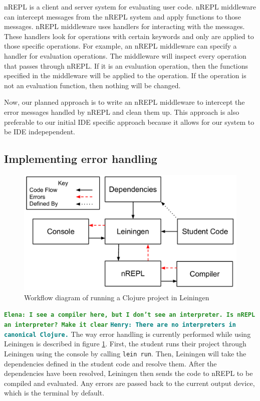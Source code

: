 \documentclass[12pt]{article}
\newcommand{\comment}[1]{{\bf \tt  {#1}}}
\newcommand{\emcomment}[1]{\textcolor{ForestGreen}{\comment{Elena: {#1}}}}
\newcommand{\hfcomment}[1]{\textcolor{Teal}{\comment{Henry: {#1}}}}
\begin{document}
nREPL is a client and server system for evaluating user code. nREPL middleware can 
intercept messages from the nREPL system and apply functions to those messages. nREPL 
middleware uses handlers for interacting with the messages. These handlers look for 
operations with certain keywords and only are applied to those specific operations. For 
example, an nREPL middleware can specify a handler for evaluation operations. The 
middleware will inspect every operation that passes through nREPL. If it is an 
evaluation operation, then the functions specified in the middleware will be applied to 
the operation. If the operation is not an evaluation function, then nothing will be 
changed.

Now, our planned approach is to write an nREPL middleware to intercept the error 
messages handled by nREPL and clean them up. This approach is also preferable to our 
initial IDE specific approach because it allows for our system to be IDE indepependent. 

\subsection{Implementing error handling}

\begin{figure}[h]
 \includegraphics[width=12cm]{CurrentErrorHandling.pdf}
 \centering
 \caption{Workflow diagram of running a Clojure project in Leiningen}
 \label{fig:CurrentError}
\end{figure}

\emcomment{I see a compiler here, but I don't see an interpreter. Is nREPL an 
interpreter? Make it clear} \hfcomment{There are no interpreters in canonical Clojure.}
The way error handling is currently performed while using Leiningen is described in 
figure \ref{fig:CurrentError}. First, the student runs their project through Leiningen 
using the console by calling \texttt{lein run}. Then, Leiningen will take the 
dependencies defined in the student code and resolve them. After the dependencies have 
been resolved, Leiningen then sends the code to nREPL to be compiled and evaluated. Any 
errors are passed back to the current output device, which is the terminal by default. 
\end{document}
